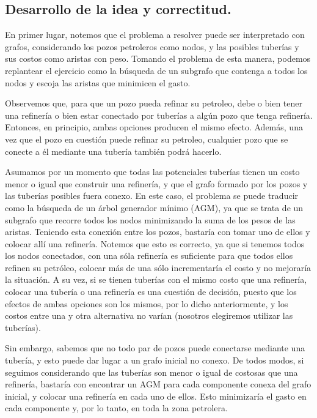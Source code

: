 \vspace*{0.6cm}

\subsection{Desarrollo de la idea y correctitud.}

\vspace*{0.3cm}

En primer lugar, notemos que el problema a resolver puede ser interpretado con grafos, considerando los pozos petroleros como nodos, y las posibles tuberías y sus costos como aristas con peso.  Tomando el problema de esta manera, podemos replantear el ejercicio como la búsqueda de un subgrafo que contenga a todos los nodos y escoja las aristas que minimicen el gasto.

Observemos que, para que un pozo pueda refinar su petroleo, debe o bien tener una refinería o bien estar conectado por tuberías a algún pozo que tenga refinería. Entonces, en principio, ambas opciones producen el mismo efecto. Además, una vez que el pozo en cuestión puede refinar su petroleo, cualquier pozo que se conecte a él mediante una tubería también podrá hacerlo.

Asumamos por un momento que todas las potenciales tuberías tienen un costo menor o igual que construir una refinería, y que el grafo formado por los pozos y las tuberías posibles fuera conexo.  En este caso, el problema se puede traducir como la búsqueda de un árbol generador mínimo (AGM), ya que se trata de un subgrafo que recorre todos los nodos minimizando la suma de los pesos de las aristas.  Teniendo esta conexión entre los pozos, bastaría con tomar uno de ellos y colocar allí una refinería. Notemos que esto es correcto, ya que si tenemos todos los nodos conectados, con una sóla refinería es suficiente para que todos ellos refinen su petróleo, colocar más de una sólo incrementaría el costo y no mejoraría la situación.  A su vez, si se tienen tuberías con el mismo costo que una refinería, colocar una tubería o una refinería es una cuestión de decisión, puesto que los efectos de ambas opciones son los mismos, por lo dicho anteriormente, y los costos entre una y otra alternativa no varían (nosotros elegiremos utilizar las tuberías).

Sin embargo, sabemos que no todo par de pozos puede conectarse mediante una tubería, y esto puede dar lugar a un grafo inicial no conexo.  De todos modos, si seguimos considerando que las tuberías son menor o igual de costosas que una refinería, bastaría con encontrar un AGM para cada componente conexa del grafo inicial, y colocar una refinería en cada uno de ellos. Esto minimizaría el gasto en cada componente y, por lo tanto, en toda la zona petrolera. 


